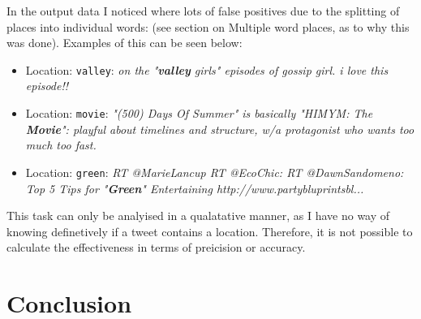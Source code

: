 \documentclass[a4paper]{article}
\begin{document}
In the output data I noticed where lots of false positives due to the splitting of places into individual words: (see section on Multiple word places, as to why this was done). Examples of this can be seen below:
\begin{itemize}
\item Location: \texttt{valley}:  \textit{on the "\textbf{valley} girls" episodes of gossip girl. i love this episode!!}
\item Location: \texttt{movie}:   \textit{"(500) Days Of Summer" is basically "HIMYM: The \textbf{Movie}": playful about timelines and structure, w/a protagonist who wants too much too fast.}
\item Location: \texttt{green}:   \textit{RT @MarieLancup RT @EcoChic: RT @DawnSandomeno: Top 5 Tips for "\textbf{Green}" Entertaining http://www.partybluprintsbl...}
\end{itemize}

This task can only be analyised in a qualatative manner, as I have no way of knowing definetively if a tweet contains a location. Therefore, it is not possible to calculate the effectiveness in terms of preicision or accuracy.

\section{Conclusion}
\end{document}
